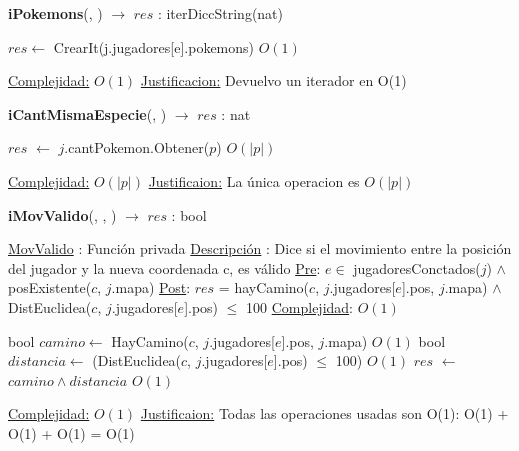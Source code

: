 \begin{Algoritmos}

\begin{algorithm}[H]
{\textbf{iPokemons}(, ) $\to$ $res$ : iterDiccString(nat)}
\begin{algorithmic}[1]

\State $res \gets $ CrearIt(j.jugadores[e].pokemons) \Comment $O(1)$

\medskip
\State \underline{Complejidad:} $O(1)$
\State \underline{Justificacion:} Devuelvo un iterador en O(1)

\end{algorithmic}
\end{algorithm}



\begin{algorithm}[H]
{\textbf{iCantMismaEspecie}(, ) $\to$ $res$ : nat}
\begin{algorithmic}[1]

\State $res$ $\gets$ $j$.cantPokemon.Obtener($p$)  \Comment $O(|p|)$

\medskip
\Statex \underline{Complejidad:} $O(|p|)$
\Statex \underline{Justificaion:} La \'unica operacion es $O(|p|)$

\end{algorithmic}
\end{algorithm}  



\begin{algorithm}[H]
{\textbf{iMovValido}(, , ) $\to$ $res$ : bool}
\begin{algorithmic}[1]

\Statex \underline{MovValido} : Funci\'on privada 
\Statex \underline{Descripci\'on} : Dice si el movimiento entre la posici\'on del jugador y la nueva coordenada c, es v\'alido 
\Statex \underline{Pre}: $e \in$ jugadoresConctados($j$) $\land$ posExistente($c$, $j$.mapa) 
\Statex \underline{Post}: $res$ = hayCamino($c$, $j$.jugadores[$e$].pos, $j$.mapa) $\land$ 
\Statex $ $\hspace*{2cm} DistEuclidea($c$, $j$.jugadores[$e$].pos) $\leq$ 100
\Statex \underline{Complejidad}: $O(1)$ 

\State bool $camino \gets$ HayCamino($c$, $j$.jugadores[$e$].pos, $j$.mapa) \Comment $O(1)$
\State bool $distancia \gets$ (DistEuclidea($c$, $j$.jugadores[$e$].pos) $\leq$ 100) \Comment $O(1)$
\State $res$ $\gets$ $camino \land distancia$ \Comment $O(1)$

\medskip
\Statex \underline{Complejidad:} $O(1)$
\Statex \underline{Justificaion:} Todas las operaciones usadas son O(1): O(1) + O(1) + O(1) = O(1)


\end{algorithmic}
\end{algorithm}
\end{Algoritmos}
